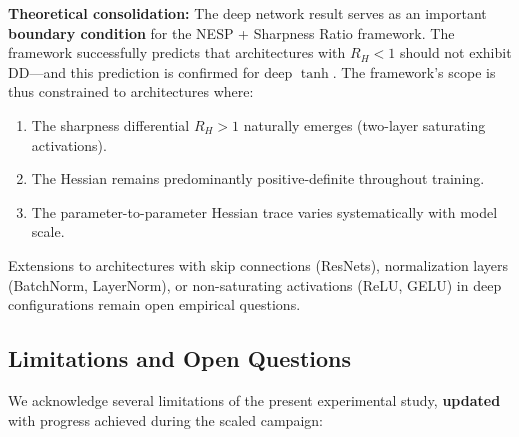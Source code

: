 \documentclass[
  journal=largetwo,
  simfonts=false,
  year=2025,
  volume=37,
]{cup-journal}
\begin{document}
\textbf{Theoretical consolidation:} The deep network result serves as an important \textbf{boundary condition} for the NESP + Sharpness Ratio framework. The framework successfully predicts that architectures with $R_H < 1$ should not exhibit DD---and this prediction is confirmed for deep $\tanh$. The framework's scope is thus constrained to architectures where:
\begin{enumerate}
    \item The sharpness differential $R_H > 1$ naturally emerges (two-layer saturating activations).
    \item The Hessian remains predominantly positive-definite throughout training.
    \item The parameter-to-parameter Hessian trace varies systematically with model scale.
\end{enumerate}
Extensions to architectures with skip connections (ResNets), normalization layers (BatchNorm, LayerNorm), or non-saturating activations (ReLU, GELU) in deep configurations remain open empirical questions.

\subsection{Limitations and Open Questions}

We acknowledge several limitations of the present experimental study, \textbf{updated} with progress achieved during the scaled campaign:
\end{document}
